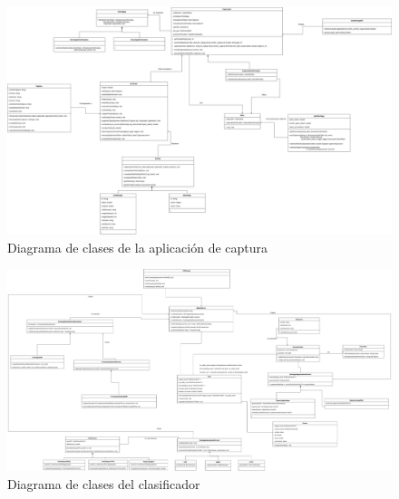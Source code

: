 
\newpage
\thispagestyle{my_landscape}
\begin{landscape}

\begin{figure}
  \caption{Diagrama de clases de la aplicación de captura}
  \centering
  \includegraphics{../figs/Cap6/Final_Diagrama_clases_appCliente.png}
\end{figure}

\newpage
\thispagestyle{my_landscape}
\begin{figure}
  \caption{Diagrama de clases del clasificador}
  \centering
  \includegraphics{../figs/Cap6/Final_Diagrama_de_clases_clasificador.png}
\end{figure}

\end{landscape}
\restoregeometry